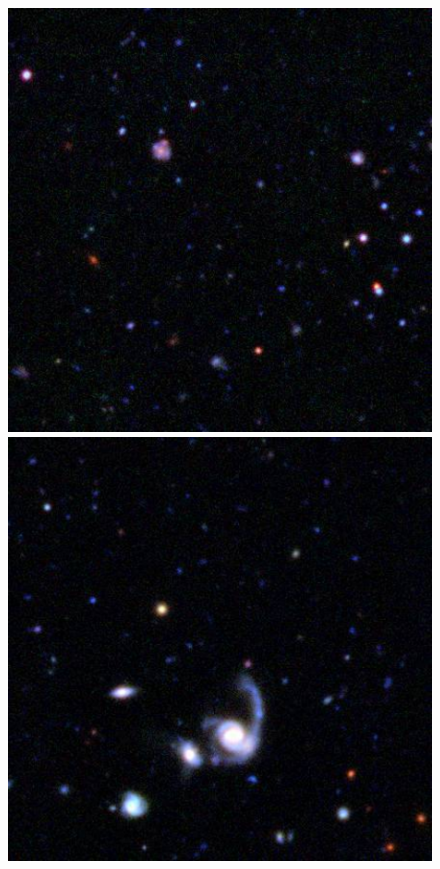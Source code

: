 \documentclass[useAMS,usenatbib,a4paper]{mn2e}
\begin{document}
\begin{figure}%
\begin{minipage}[b]{0.24\linewidth}
\centering\includegraphics[width=\linewidth]{0.pdf}
\end{minipage} \hfill
\begin{minipage}[b]{0.24\linewidth}
\centering\includegraphics[width=\linewidth]{1.pdf}

\end{minipage}
\end{figure}
\end{document}
